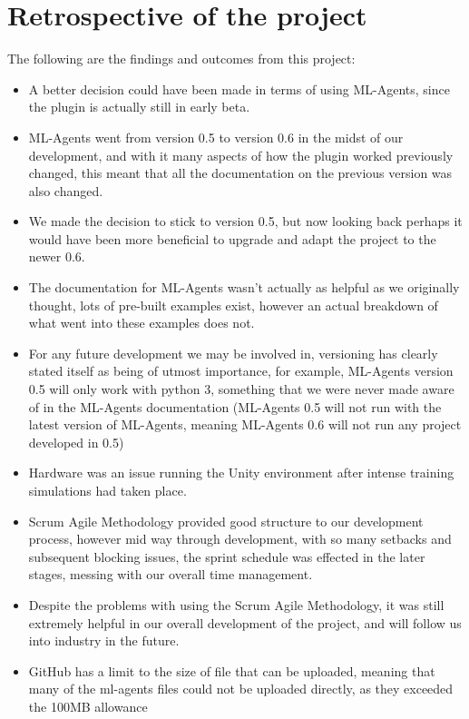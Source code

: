 \section{Retrospective of the project}
The following are the findings and outcomes from this project:
\begin{itemize}
    \item{A better decision could have been made in terms of using ML-Agents, since the plugin is actually still in early beta.}
    \item{ML-Agents went from version 0.5 to version 0.6 in the midst of our development, and with it many aspects of how the plugin worked previously changed, this meant that all the documentation on the previous version was also changed.}
	\item{We made the decision to stick to version 0.5, but now looking back perhaps it would have been more beneficial to upgrade and adapt the project to the newer 0.6.}
    \item{The documentation for ML-Agents wasn't actually as helpful as we originally thought, lots of pre-built examples exist, however an actual breakdown of what went into these examples does not.}
    \item{For any future development we may be involved in, versioning has clearly stated itself as being of utmost importance, for example, ML-Agents version 0.5 will only work with python 3, something that we were never made aware of in the ML-Agents documentation (ML-Agents 0.5 will not run with the latest version of ML-Agents, meaning ML-Agents 0.6 will not run any project developed in 0.5)}
    \item{Hardware was an issue running the Unity environment after intense training simulations had taken place.}
    \item{Scrum Agile Methodology provided good structure to our development process, however mid way through development, with so many setbacks and subsequent blocking issues, the sprint schedule was effected in the later stages, messing with our overall time management.}
	\item{Despite the problems with using the Scrum Agile Methodology, it was still extremely helpful in our overall development of the project, and will follow us into industry in the future.}
    \item{GitHub has a limit to the size of file that can be uploaded, meaning that many of the ml-agents files could not be uploaded directly, as they exceeded the 100MB allowance}
\end{itemize}

